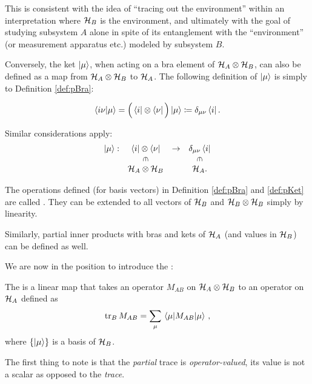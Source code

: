 This is consistent with the idea of
``tracing out the environment'' within an interpretation where
$\mathcal{H}_B$ is the environment, and ultimately with the goal of
studying subsystem $A$ alone in spite of its entanglement with the
``environment'' (or measurement apparatus etc.) modeled by
subsystem $B$.

Conversely,
the ket $\ket{\mu}$, when acting on a bra element of $\mathcal{H}_{A} \otimes \mathcal{H}_{B}$,
can also be defined
as a map from $\mathcal{H}_A\otimes\mathcal{H}_B$ to $\mathcal{H}_A$.
The following definition of $\ket{\mu}$ is simply  to Definition \ref{def:pBra}:
\begin{definition}\label{def:pKet}
  \[
    \braket{i\nu}{\mu} = \Big(\bra{i}\otimes\bra{\nu}\Big)\ket{\mu} \coloneqq \delta_{\mu\nu}\bra{i} \text{.}
  \]
\end{definition}
Similar considerations apply:
\[
  \begin{array}{cccc}
    \ket{\mu}:  & \bra{i}\ox\bra{\nu}                   & \rightarrow & \delta_{\mu\nu}\bra{i}               \\
                & \rotatebox[origin=c]{270}{$\in$}      &             & \rotatebox[origin=c]{270}{$\in$}      \\
                & \hilb{H}_A\ox\hilb{H}_B               &             & \hilb{H}_A     \text{.}
  \end{array}
\]


The operations defined (for basis vectors) in Definition \ref{def:pBra} and \ref{def:pKet}
are called  \parencite[.3]{QMT_Jacobs}.
They can be extended to all vectors of $\mathcal{H}_B$ and $\mathcal{H}_B\otimes\mathcal{H}_B$
simply by linearity.

Similarly, partial inner products with bras and kets of $\mathcal{H}_A$
(and values in $\mathcal{H}_B$) can be defined as well.

We are now in the position to introduce the :
\begin{definition}\label{def:pTr}
  The 
  is a linear map
  that takes an operator
  $M_{AB}$ on $\mathcal{H}_A \otimes \mathcal{H}_B$
  to an operator on $\mathcal{H}_A$ defined as
  \[
    \tr_B M_{AB} = \sum_{\mu} \matrixel{\mu}{M_{AB}}{\mu}
    \, \text{,}
  \]
  where $\left\{\ket{\mu}\right\}$ is a basis of $\mathcal{H}_B$.
\end{definition}

The first thing to note is that the \emph{partial} trace is \emph{operator-valued},
its value is not a scalar as opposed to the \emph{trace}.

